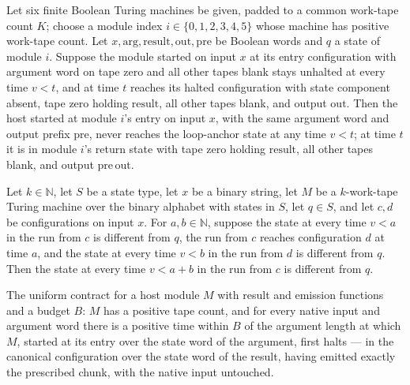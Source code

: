 \begin{lemma}
\label{Complexity.satHost_call}
\leanok
{}
Let six finite Boolean Turing machines be given, padded to a common work-tape count $K$;
choose a module index $i\in\{0,1,2,3,4,5\}$ whose machine has positive work-tape count.
Let $x,\mathrm{arg},\mathrm{result},\mathrm{out},\mathrm{pre}$ be Boolean words and $q$
a state of module $i$. Suppose the module started on input $x$ at its entry
configuration with argument word on tape zero and all other tapes blank stays unhalted
at every time $v<t$, and at time $t$ reaches its halted configuration with state
component absent, tape zero holding $\mathrm{result}$, all other tapes blank, and output
$\mathrm{out}$. Then the host started at module $i$'s entry on input $x$, with the same
argument word and output prefix $\mathrm{pre}$, never reaches the loop-anchor state at
any time $v<t$; at time $t$ it is in module $i$'s return state with tape zero holding
$\mathrm{result}$, all other tapes blank, and output $\mathrm{pre}\,\mathrm{out}$.
\end{lemma}

\begin{lemma}
\label{Complexity.sat_guard_add}
\leanok
{}
Let $k\in\mathbb{N}$, let $S$ be a state type, let $x$ be a binary string, let $M$ be a
$k$-work-tape Turing machine over the binary alphabet with states in $S$, let $q\in S$,
and let $c,d$ be configurations on input $x$. For $a,b\in\mathbb{N}$, suppose the state
at every time $v<a$ in the run from $c$ is different from $q$, the run from $c$ reaches
configuration $d$ at time $a$, and the state at every time $v<b$ in the run from $d$ is
different from $q$. Then the state at every time $v<a+b$ in the run from $c$ is
different from $q$.
\end{lemma}

\begin{definition}
\label{Complexity.SatClean}
\leanok
{}
The uniform contract for a host module $M$ with result and emission functions
and a budget $B$: $M$ has a positive tape count, and for every native input and
argument word there is a positive time within $B$ of the argument length at
which $M$, started at its entry over the state word of the argument, first halts
— in the canonical configuration over the state word of the result, having
emitted exactly the prescribed chunk, with the native input untouched.
\end{definition}

